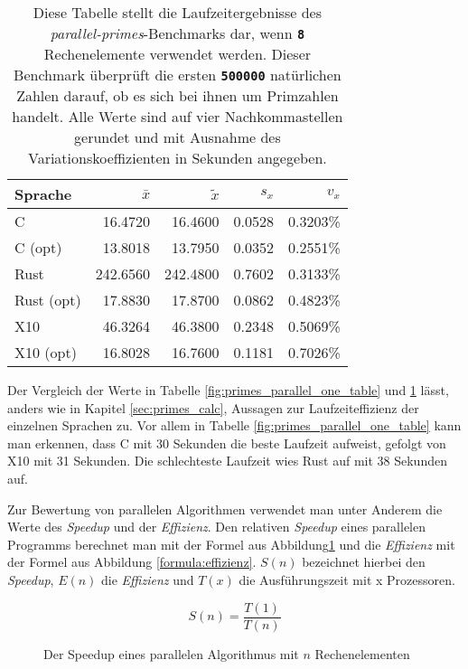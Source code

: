 \begin{table}[hb]
	\begin{center}
		\begin{tabular}{lrrrr}
			\toprule
			Sprache & $\bar{x}$ & $\tilde{x}$ & $s_x$ & $v_x$ \\
			\midrule
			C          &  16.4720 &  16.4600 & 0.0528 & 0.3203\% \\
			C (opt)    &  13.8018 &  13.7950 & 0.0352 & 0.2551\% \\
			Rust       & 242.6560 & 242.4800 & 0.7602 & 0.3133\% \\
			Rust (opt) &  17.8830 &  17.8700 & 0.0862 & 0.4823\% \\
			X10        &  46.3264 &  46.3800 & 0.2348 & 0.5069\% \\
			X10 (opt)  &  16.8028 &  16.7600 & 0.1181 & 0.7026\% \\
			\bottomrule
		\end{tabular}
	\end{center}
	\caption{
		Diese Tabelle stellt die Laufzeitergebnisse des \textit{parallel-primes}-Benchmarks dar,
		wenn \texttt{\textsc{\textbf{8}}} Rechenelemente verwendet werden.
		Dieser Benchmark überprüft die ersten \texttt{\textsc{\textbf{500000}}} natürlichen Zahlen darauf,
		ob es sich bei ihnen um Primzahlen handelt.
		Alle Werte sind auf vier Nachkommastellen gerundet und mit Ausnahme des Variationskoeffizienten
		in Sekunden angegeben.
	}
	\label{fig:primes_parallel_eight_table}
\end{table}

Der Vergleich der Werte in Tabelle \ref{fig:primes_parallel_one_table} und \ref{fig:primes_parallel_eight_table} 
lässt, anders wie in Kapitel \ref{sec:primes_calc}, Aussagen zur Laufzeiteffizienz der einzelnen Sprachen zu.
Vor allem in Tabelle \ref{fig:primes_parallel_one_table} kann man erkennen, dass C mit 30 Sekunden die beste Laufzeit aufweist,
gefolgt von X10 mit 31 Sekunden. Die schlechteste Laufzeit wies Rust auf mit 38 Sekunden auf.

Zur Bewertung von parallelen Algorithmen verwendet man unter Anderem die Werte des \textit{Speedup}
und der \textit{Effizienz}.
Den relativen \textit{Speedup} eines parallelen Programms berechnet man mit der Formel aus Abbildung\ref{formula:speedup} und die
\textit{Effizienz} mit der Formel aus Abbildung \ref{formula:effizienz}. $S(n)$ bezeichnet hierbei den \textit{Speedup},
$E(n)$ die \textit{Effizienz} und $T(x)$ die Ausführungszeit mit x Prozessoren.

\begin{figure}
	\caption{Der Speedup eines parallelen Algorithmus mit $n$ Rechenelementen}
	\begin{equation*}
		S(n) = \frac{T(1)}{T(n)}
	\end{equation*}
	\label{formula:speedup}
\end{figure}

